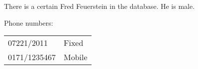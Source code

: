\documentclass[a4paper]{article}
\begin{document}
There is a certain Fred Feuerstein in the database. He is male.


Phone numbers:

  \begin{tabular}{ll}
07221/2011 & Fixed \\
0171/1235467 & Mobile \\
\end{tabular}
\end{document}
